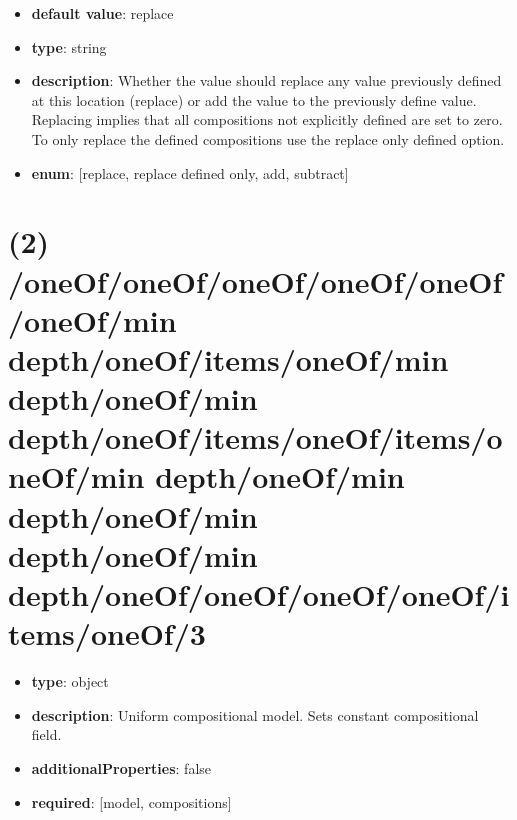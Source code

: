 \begin{itemize}[leftmargin=3em]\item {\bf default value}: replace
\item {\bf type}: string
\item {\bf description}: Whether the value should replace any value previously defined at this location (replace) or add the value to the previously define value. Replacing implies that all compositions not explicitly defined are set to zero. To only replace the defined compositions use the replace only defined option.
\item {\bf enum}: [replace, replace defined only, add, subtract]\end{itemize}\section{(2) /oneOf/oneOf/oneOf/oneOf/oneOf/oneOf/min depth/oneOf/items/oneOf/min depth/oneOf/min depth/oneOf/items/oneOf/items/oneOf/min depth/oneOf/min depth/oneOf/min depth/oneOf/min depth/oneOf/oneOf/oneOf/oneOf/items/oneOf/3}
\begin{itemize}[leftmargin=2em]\item {\bf type}: object
\item {\bf description}: Uniform compositional model. Sets constant compositional field.
\item {\bf additionalProperties}: false
\item {\bf required}: [model, compositions]\end{itemize}
